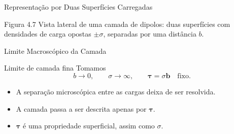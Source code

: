 \documentclass[aspectratio=169]{beamer}
\begin{document}
\begin{frame}{Representação por Duas Superfícies Carregadas}

\begin{center}
\end{center}

\begin{mybox}{Figura 4.7}
Vista lateral de uma camada de dipolos: duas superfícies com densidades de carga opostas \(\pm\sigma\), separadas por uma distância \(b\).
\end{mybox}

\end{frame}

\begin{frame}{Limite Macroscópico da Camada}

\begin{mybox}{Limite de camada fina}
Tomamos
\[
b\to 0,
\qquad
\sigma\to \infty,
\qquad
\boldsymbol{\tau}=\sigma\mathbf b
\quad \text{fixo}.
\]
\end{mybox}

\begin{itemize}
\item A separação microscópica entre as cargas deixa de ser resolvida.
\item A camada passa a ser descrita apenas por \(\boldsymbol{\tau}\).
\item \(\boldsymbol{\tau}\) é uma propriedade superficial, assim como \(\sigma\).
\end{itemize}

\end{frame}
\end{document}

